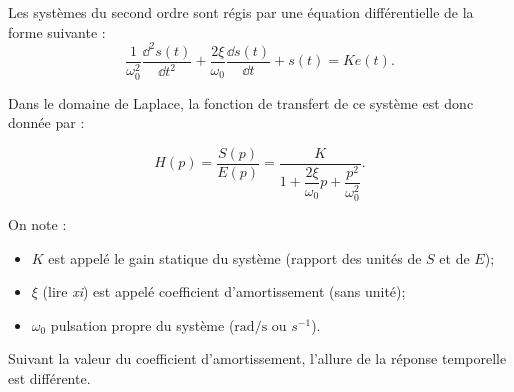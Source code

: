 \begin{defi}

Les systèmes du second ordre sont régis par une équation différentielle de la
forme suivante :
$$
\dfrac{1}{\omega_0^2} \dfrac{\dd^2 s(t)}{\dd t^2}+\dfrac{2\xi}{\omega_0} \dfrac{\dd s(t)}{\dd t}+s(t) = Ke(t).
$$

Dans le domaine de Laplace, la fonction de transfert de ce système est donc
donnée par :

\begin{minipage}[c]{.6\linewidth}
$$
H(p)=\dfrac{S(p)}{E(p)} = \dfrac{K}{1+ \dfrac{2\xi}{\omega_0}p+\dfrac{p^2}{\omega_0^2}}.
$$
\end{minipage}\hfill
\begin{minipage}[c]{.35\linewidth}

\begin{center}
\end{center}
\end{minipage}


On note :
\begin{itemize}
\item $K$ est appelé le gain statique du système (rapport des unités de $S$ et de $E$);
\item $\xi$ (lire \textit{xi}) est appelé coefficient d'amortissement (sans unité);
\item $\omega_0$ pulsation propre du système ($\text{rad/s}$ ou $s^{-1}$).
\end{itemize}


Suivant la valeur du coefficient d'amortissement, l'allure de la réponse temporelle est différente.
\end{defi}

